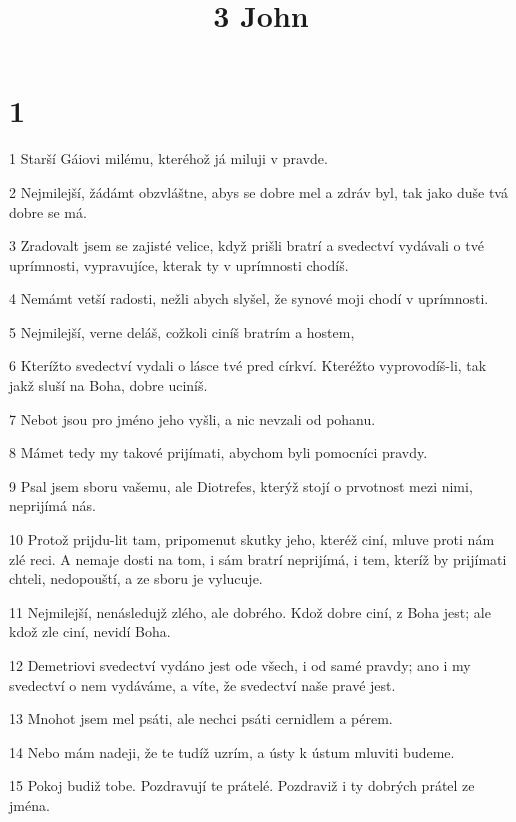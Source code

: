 

\title{3 John}

\chapter{1}

\par 1 Starší Gáiovi milému, kteréhož já miluji v pravde.
\par 2 Nejmilejší, žádámt obzvláštne, abys se dobre mel a zdráv byl, tak jako duše tvá dobre se má.
\par 3 Zradovalt jsem se zajisté velice, když prišli bratrí a svedectví vydávali o tvé uprímnosti, vypravujíce, kterak ty v uprímnosti chodíš.
\par 4 Nemámt vetší radosti, nežli abych slyšel, že synové moji chodí v uprímnosti.
\par 5 Nejmilejší, verne deláš, cožkoli ciníš bratrím a hostem,
\par 6 Kterížto svedectví vydali o lásce tvé pred církví. Kteréžto vyprovodíš-li, tak jakž sluší na Boha, dobre uciníš.
\par 7 Nebot jsou pro jméno jeho vyšli, a nic nevzali od pohanu.
\par 8 Mámet tedy my takové prijímati, abychom byli pomocníci pravdy.
\par 9 Psal jsem sboru vašemu, ale Diotrefes, kterýž stojí o prvotnost mezi nimi, neprijímá nás.
\par 10 Protož prijdu-lit tam, pripomenut skutky jeho, kteréž ciní, mluve proti nám zlé reci. A nemaje dosti na tom, i sám bratrí neprijímá, i tem, kteríž by prijímati chteli, nedopouští, a ze sboru je vylucuje.
\par 11 Nejmilejší, nenásledujž zlého, ale dobrého. Kdož dobre ciní, z Boha jest; ale kdož zle ciní, nevidí Boha.
\par 12 Demetriovi svedectví vydáno jest ode všech, i od samé pravdy; ano i my svedectví o nem vydáváme, a víte, že svedectví naše pravé jest.
\par 13 Mnohot jsem mel psáti, ale nechci psáti cernidlem a pérem.
\par 14 Nebo mám nadeji, že te tudíž uzrím, a ústy k ústum mluviti budeme.
\par 15 Pokoj budiž tobe. Pozdravují te prátelé. Pozdraviž i ty dobrých prátel ze jména.


